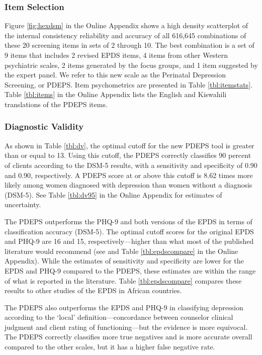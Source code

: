 \documentclass[man,natbib,longtable]{apa6}\usepackage[]{graphicx}\usepackage[]{color}
\begin{document}
\subsubsection{Item Selection}

Figure \ref{fig:hexdsm} in the Online Appendix shows a high density scatterplot of the internal consistency reliability and accuracy of all 616,645 combinations of these 20 screening items in sets of 2 through 10. The best combination is a set of 9 items that includes 2 revised EPDS items, 4 items from other Western psychiatric scales, 2 items generated by the focus groups, and 1 item suggested by the expert panel. We refer to this new scale as the Perinatal Depression Screening, or PDEPS. Item psychometrics are presented in Table \ref{tbl:itemstats}. Table \ref{tbl:items} in the Online Appendix lists the English and Kiswahili translations of the PDEPS items.



\subsubsection{Diagnostic Validity}

As shown in Table \ref{tbl:dv}, the optimal cutoff for the new PDEPS tool is greater than or equal to 13. Using this cutoff, the PDEPS correctly classifies 90 percent of clients according to the DSM-5 results, with a sensitivity and specificity of 0.90 and 0.90, respectively. A PDEPS score at or above this cutoff is 8.62 times more likely among women diagnosed with depression than women without a diagnosis (DSM-5). See Table \ref{tbl:dv95} in the Online Appendix for estimates of uncertainty.

The PDEPS outperforms the PHQ-9 and both versions of the EPDS in terms of classification accuracy (DSM-5). The optimal cutoff scores for the original EPDS and PHQ-9 are 16 and 15, respectively---higher than what most of the published literature would recommend (see \citep{kroenke:2001} and Table \ref{tbl:epdscompare} in the Online Appendix). While the estimates of sensitivity and specificity are lower for the EPDS and PHQ-9 compared to the PDEPS, these estimates are within the range of what is reported in the literature. Table \ref{tbl:epdscompare} compares these results to other studies of the EPDS in African countries.

The PDEPS also outperforms the EPDS and PHQ-9 in classifying depression according to the `local' definition---concordance between counselor clinical judgment and client rating of functioning---but the evidence is more equivocal. The PDEPS correctly classifies more true negatives and is more accurate overall compared to the other scales, but it has a higher false negative rate. 
\end{document}
